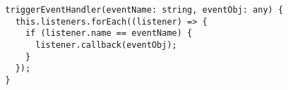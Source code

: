 \begin{verbatim}
  triggerEventHandler(eventName: string, eventObj: any) {
    this.listeners.forEach((listener) => {
      if (listener.name == eventName) {
        listener.callback(eventObj);
      }
    });
  }
\end{verbatim}
